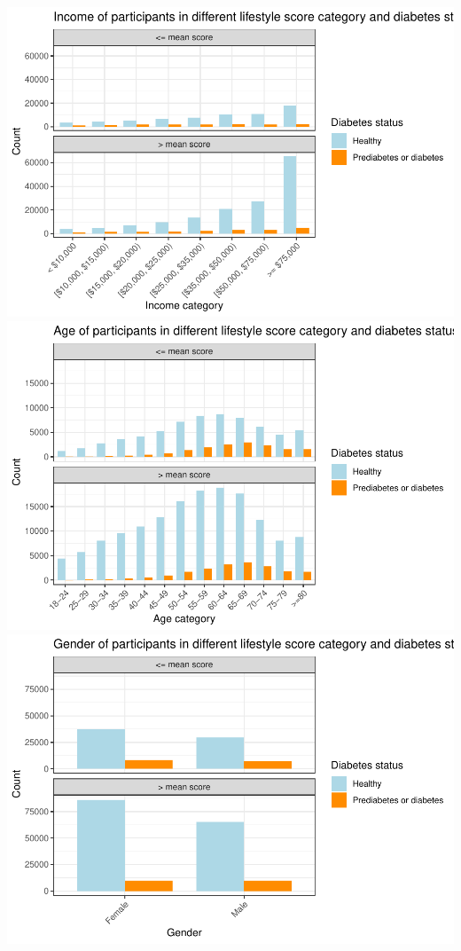 \documentclass[
  12pt,
]{article}
\begin{document}
\includegraphics{template_files/figure-latex/unnamed-chunk-3-1.pdf}
\includegraphics{template_files/figure-latex/unnamed-chunk-3-2.pdf}
\includegraphics{template_files/figure-latex/unnamed-chunk-3-3.pdf}
\end{document}

